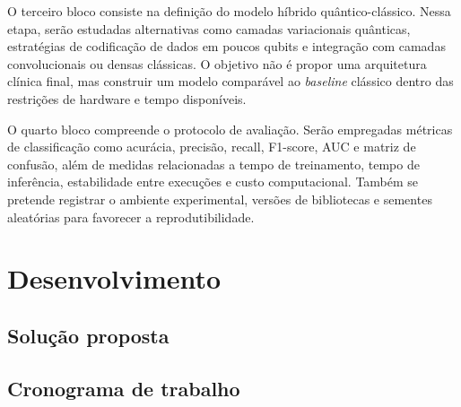 \documentclass[
    12pt,
    openright,
    oneside,
    a4paper,
    english,
    brazil
]{abntex2}
\begin{document}
O terceiro bloco consiste na definição do modelo híbrido quântico-clássico. Nessa etapa, serão estudadas alternativas como camadas variacionais quânticas, estratégias de codificação de dados em poucos qubits e integração com camadas convolucionais ou densas clássicas. O objetivo não é propor uma arquitetura clínica final, mas construir um modelo comparável ao \textit{baseline} clássico dentro das restrições de hardware e tempo disponíveis.

O quarto bloco compreende o protocolo de avaliação. Serão empregadas métricas de classificação como acurácia, precisão, recall, F1-score, AUC e matriz de confusão, além de medidas relacionadas a tempo de treinamento, tempo de inferência, estabilidade entre execuções e custo computacional. Também se pretende registrar o ambiente experimental, versões de bibliotecas e sementes aleatórias para favorecer a reprodutibilidade.



\chapter{Desenvolvimento}
\label{cap:desenvolvimento}


\section{Solução proposta}
\label{sec:solucao}


\section{Cronograma de trabalho}
\label{sec:cronograma}

\postextual

\end{document}
